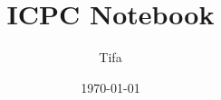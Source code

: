 \documentclass{ICPCnotebook}
\title{\vspace{-4ex}\Large{ICPC Notebook}}
\author{Tifa}
\date{\today}
\begin{document}
    \maketitle

    \pagestyle{plain}

	\setcounter{page}{1}

    \begin{multicols}{2}
        \tableofcontents
    \end{multicols}

    \newpage

	\pagestyle{fancy}
	\setcounter{page}{1}

    \begin{multicols}{2}
        
        
    \end{multicols}

    
    
\end{document}
